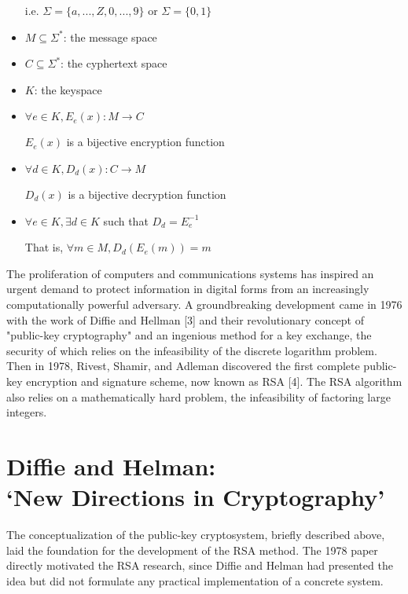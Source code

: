 \documentclass[12pt]{article}
\begin{document}
\begin{multicols}{2}
\begin{itemize}
     i.e. $\Sigma=\{a,...,Z,0,...,9\}$ or $\Sigma=\{0,1\}$

\item $M \subseteq \Sigma^*$: the message space

\item $C \subseteq \Sigma^*$: the cyphertext space

\item $K$: the keyspace

\item $\forall e \in K, E_e(x):M \to C$ 
    
    $E_e(x)$ is a bijective encryption function

\item $\forall d \in K, D_d(x):C\to M$ 

    $D_d(x)$ is a bijective decryption function

\item $ \forall e \in K, \exists d \in K$ such that $D_d=E_e^{-1}$ 

    That is, $\forall m \in M, D_d(E_e(m))=m$

\end{itemize}

The proliferation of computers and communications systems has inspired an urgent demand to protect information in digital forms from an increasingly computationally powerful adversary. A groundbreaking development came in 1976 with the work of Diffie and Hellman [3] and their revolutionary concept of "public-key cryptography" and an ingenious method for a key exchange, the security of which relies on the infeasibility of the discrete logarithm problem. Then in 1978, Rivest, Shamir, and Adleman discovered the first complete public-key encryption and signature scheme, now known as RSA [4]. The RSA algorithm also relies on a mathematically hard problem, the infeasibility of factoring large integers. 

\maketitle
\section*{Diffie and Helman: \\ \large `New Directions in Cryptography'}

The conceptualization of the public-key cryptosystem, briefly described above, laid the foundation for the development of the RSA method. The 1978 paper directly motivated the RSA research, since Diffie and Helman had presented the idea but did not formulate any practical implementation of a concrete system.


\end{multicols}
\end{document}
